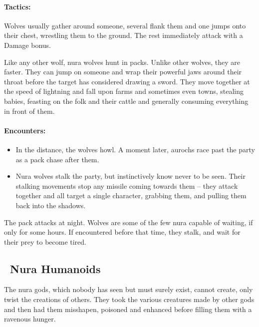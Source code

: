 \begin{multicols}{2}
\label{nura_wolf}

\paragraph{Tactics:} Wolves usually gather around someone, several flank them and one jumps onto their chest, wrestling them to the ground.
The rest immediately attack with a Damage bonus.

Like any other wolf, nura wolves hunt in packs.
Unlike other wolves, they are faster.
They can jump on someone and wrap their powerful jaws around their throat before the target has considered drawing a sword.
They move together at the speed of lightning and fall upon farms and sometimes even towns, stealing babies, feasting on the folk and their cattle and generally consuming everything in front of them.

\paragraph{Encounters:}

\begin{itemize}

  \item
  In the distance, the wolves howl.
  A moment later, aurochs race past the party as a pack chase after them.
  \item
  Nura wolves stalk the party, but instinctively know never to be seen.
  Their stalking movements stop any missile coming towards them -- they attack together and all target a single character, grabbing them, and pulling them back into the shadows.

\end{itemize}

The pack attacks at night.
Wolves are some of the few nura capable of waiting, if only for some hours.
If encountered before that time, they stalk, and wait for their prey to become tired.


\subsection[Nura Humanoids]{\E\N\ Nura Humanoids}

The nura gods, which nobody has seen but must surely exist, cannot create, only twist the creations of others.  They took the various creatures made by other gods and then had them misshapen, poisoned and enhanced before filling them with a ravenous hunger.


\end{multicols}
